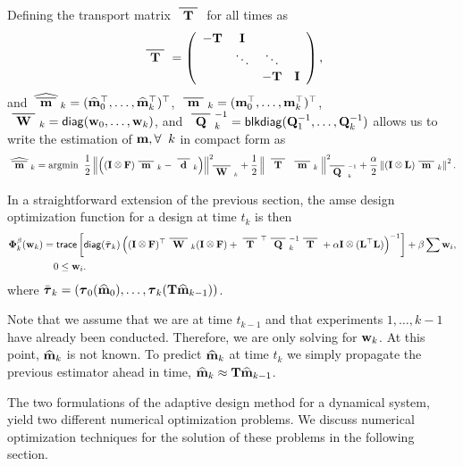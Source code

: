 \documentclass[final,leqno,onefignum,onetabnum]{siamltexmm}
\begin{document}
Defining the transport matrix $\Tbar$ for all times as
%
\begin{align}
\Tbar = \left( \begin{array}{cccc} -\bfT & \bfI &   \\  & \ddots & \ddots\\ & &   -\bfT & \bfI  \end{array}\right),
\end{align}
%
and  $\widehat{\mbar}_k = (\bfmhat_0^{\top}, \hdots, \bfmhat_k^{\top})^{\top}$, $\mbar_k = (\bfm_0^{\top}, \hdots, \bfm_k^{\top})^{\top}$, $\Wbar_k = {\sf diag}(\bfw_0,\hdots,\bfw_k)$, and $ \Qbar^{-1}_k = {\sf blkdiag}(\bfQ^{-1}_1,\hdots,\bfQ^{-1}_k)$  
allows us to write the estimation of  ${\bf{m}}, \forall \;\; k$ in compact form as
%
\begin{align}
\label{noisymk}
\widehat{\mbar}_k = {\rm argmin } \;\;\hf \left\| \left((\bfI \kronecker \bfF)\mbar_k - \dbar_k\right)\right\|^2_{\Wbar_k} + \hf\left\|
\;\Tbar\;\mbar_k
\;\right\|^2_{\Qbar^{-1}_k} + {\frac \alpha 2} \left\| (\bfI \kronecker \bfL)\mbar_k \right\|^{2}.
\end{align} 
%

In a straightforward extension of the previous section, 
the amse design optimization function for a design at time $t_k$ is then
%
\begin{align}
\label{eq:noisyOpt}
\nonumber
\bfPhi^{\beta}_k(\bfw_k) =
&\;{\sf trace}\left[ {\sf diag}(\bar{\bftau}_{k}) \left((\bfI \kronecker \bfF)^{\top}\Wbar_k(\bfI \kronecker \bfF)  +
\Tbar^{\top}\Qbar^{-1}_k\Tbar + \alpha \bfI \kronecker(\LtL)
\right)^{-1}\right] + \beta \sum \bfw_i,  \\
 &0 \leq \bfw_i.
\end{align}
%
where $\bar{{\boldsymbol \tau}}_{k} = \left({\boldsymbol \tau}_0({\widehat{{\bf{m}}}}_0), \hdots, {\boldsymbol \tau}_k({\bf{T}}{\widehat{{\bf{m}}}}_{k-1})\right)$. 

Note that we assume that we are at time $t_{k-1}$ and that experiments $1,\ldots,k-1$ have already been conducted.
Therefore, we are only solving for ${\bf{w}}_k$. At this point,  ${\widehat{{\bf{m}}}}_k$ is not known. 
To predict ${\widehat{{\bf{m}}}}_k$ at time $t_k$ we simply propagate the previous estimator ahead in time, ${\widehat{{\bf{m}}}}_k \approx {\bf{T}}{\widehat{{\bf{m}}}}_{k-1}$. 

The two formulations of the adaptive design method for a dynamical system, yield two different numerical optimization problems. We discuss numerical optimization techniques for the solution of these problems in the following section.
%
%
%
\end{document}
